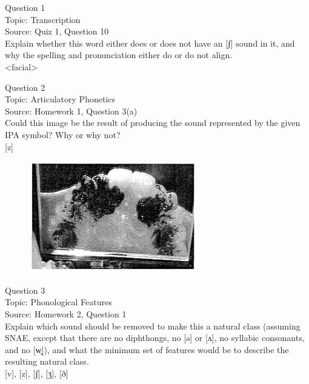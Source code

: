 \documentclass[12pt]{article}
\begin{document}
{\large Question 1}\\

Topic: Transcription\\
Source: Quiz 1, Question 10\\

Explain whether this word either does or does not have an [ʃ] sound in it, and why the spelling and pronunciation either do or do not align.\\

<facial>


\newpage

{\large Question 2}\\

Topic: Articulatory Phonetics\\
Source: Homework 1, Question 3(a)\\

Could this image be the result of producing the sound represented by the given IPA symbol? Why or why not?\\

{[z]}

\begin{figure}[H]
\includegraphics{../images/staticpalatography_fricative.png}
\end{figure}

\newpage

{\large Question 3}\\

Topic: Phonological Features\\
Source: Homework 2, Question 1\\

Explain which sound should be removed to make this a natural class (assuming SNAE, except that there are no diphthongs, no [ə] or [ʌ], no syllabic consonants, and no [w̥]), and what the minimum set of features would be to describe the resulting natural class.\\

{[v]}, {[z]}, {[ʃ]}, {[ʒ]}, {[ð]}


\newpage
\end{document}
